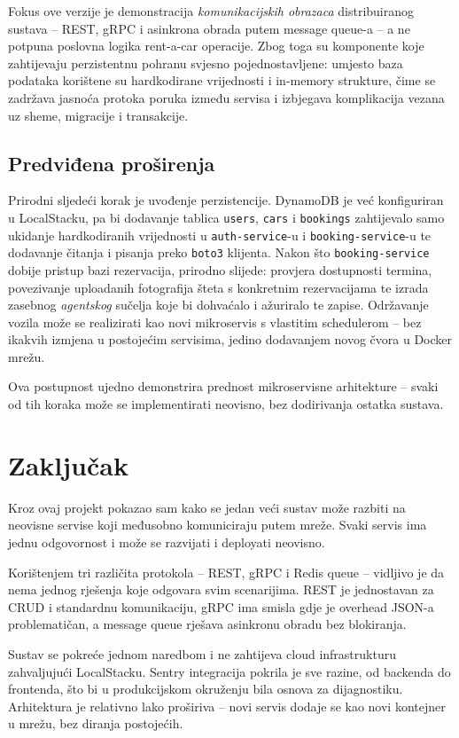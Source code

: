\documentclass[12pt,a4paper]{article}
\begin{document}
Fokus ove verzije je demonstracija \emph{komunikacijskih obrazaca} distribuiranog sustava -- REST, gRPC i asinkrona obrada putem message queue-a -- a ne potpuna poslovna logika rent-a-car operacije. Zbog toga su komponente koje zahtijevaju perzistentnu pohranu svjesno pojednostavljene: umjesto baza podataka korištene su hardkodirane vrijednosti i in-memory strukture, čime se zadržava jasnoća protoka poruka između servisa i izbjegava komplikacija vezana uz sheme, migracije i transakcije.

\subsection{Predviđena proširenja}

Prirodni sljedeći korak je uvođenje perzistencije. DynamoDB je već konfiguriran u LocalStacku, pa bi dodavanje tablica \texttt{users}, \texttt{cars} i \texttt{bookings} zahtijevalo samo ukidanje hardkodiranih vrijednosti u \texttt{auth-service}-u i \texttt{booking-service}-u te dodavanje čitanja i pisanja preko \texttt{boto3} klijenta. Nakon što \texttt{booking-service} dobije pristup bazi rezervacija, prirodno slijede: provjera dostupnosti termina, povezivanje uploadanih fotografija šteta s konkretnim rezervacijama te izrada zasebnog \emph{agentskog} sučelja koje bi dohvaćalo i ažuriralo te zapise. Održavanje vozila može se realizirati kao novi mikroservis s vlastitim schedulerom -- bez ikakvih izmjena u postojećim servisima, jedino dodavanjem novog čvora u Docker mrežu.

Ova postupnost ujedno demonstrira prednost mikroservisne arhitekture -- svaki od tih koraka može se implementirati neovisno, bez dodirivanja ostatka sustava.

\section{Zaključak}

Kroz ovaj projekt pokazao sam kako se jedan veći sustav može razbiti na neovisne servise koji međusobno komuniciraju putem mreže. Svaki servis ima jednu odgovornost i može se razvijati i deployati neovisno.

Korištenjem tri različita protokola -- REST, gRPC i Redis queue -- vidljivo je da nema jednog rješenja koje odgovara svim scenarijima. REST je jednostavan za CRUD i standardnu komunikaciju, gRPC ima smisla gdje je overhead JSON-a problematičan, a message queue rješava asinkronu obradu bez blokiranja.

Sustav se pokreće jednom naredbom i ne zahtijeva cloud infrastrukturu zahvaljujući LocalStacku. Sentry integracija pokrila je sve razine, od backenda do frontenda, što bi u produkcijskom okruženju bila osnova za dijagnostiku. Arhitektura je relativno lako proširiva -- novi servis dodaje se kao novi kontejner u mrežu, bez diranja postojećih.
\end{document}
